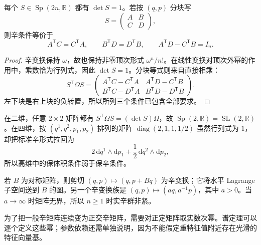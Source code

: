 \begin{proposition}\label{g4:prop:0701:symplectic-matrices}
	每个 \(S\in\operatorname{Sp}(2n,\mathbb R)\) 都有 \(\det S=1\)。若按 \((q,p)\) 分块写
	\[
		S=\begin{pmatrix}A&B\\C&D\end{pmatrix},
	\]
	则辛条件等价于
	\begin{equation}\label{g4:eq:0701:symplectic-blocks}
		A^{\mathsf T}C=C^{\mathsf T}A,\qquad
		B^{\mathsf T}D=D^{\mathsf T}B,\qquad
		A^{\mathsf T}D-C^{\mathsf T}B=I_n.
	\end{equation}
\end{proposition}
\begin{proof}
	辛变换保持 \(\omega\)，故也保持非零顶次形式 \(\omega^n/n!\)。在线性变换对顶次外幂的作用中，乘数恰为行列式，因此 \(\det S=1\)。分块等式则来自直接相乘：
	\[
		S^{\mathsf T}\Omega S=
		\begin{pmatrix}
			A^{\mathsf T}C-C^{\mathsf T}A&A^{\mathsf T}D-C^{\mathsf T}B\\
			B^{\mathsf T}C-D^{\mathsf T}A&B^{\mathsf T}D-D^{\mathsf T}B
		\end{pmatrix}.
	\]
	左下块是右上块的负转置，所以所列三个条件已包含全部要求。
\end{proof}

\begin{example}\label{g4:exm:0701:symplectic-matrices}
	在二维，任意 \(2\times2\) 矩阵都有 \(S^{\mathsf T}\Omega S=(\det S)\Omega\)，故 \(\operatorname{Sp}(2,\mathbb R)=\operatorname{SL}(2,\mathbb R)\)。在四维，按 \((q^1,q^2,p_1,p_2)\) 排列的矩阵 \(\operatorname{diag}(2,1,1,1/2)\) 虽然行列式为 \(1\)，却把标准辛形式拉回为
	\[
		2\,\mathrm{d}q^1\wedge\mathrm{d}p_1
		+\frac12\,\mathrm{d}q^2\wedge\mathrm{d}p_2,
	\]
	所以高维中的保体积条件弱于保辛条件。

	若 \(B\) 为对称矩阵，则剪切 \((q,p)\mapsto(q,p+Bq)\) 为辛变换；它将水平 Lagrange 子空间送到 \(B\) 的图。另一个辛变换族是 \((q,p)\mapsto(aq,a^{-1}p)\)，其中 \(a>0\)。当 \(a\to\infty\) 时矩阵无界，所以 \(n\ge1\) 时实辛群非紧。
\end{example}

为了把一般辛矩阵连续变为正交辛矩阵，需要对正定矩阵取实数次幂。谱定理可以逐个定义这些幂；参数依赖还需单独说明，因为不能假定重特征值附近存在光滑的特征向量基。

